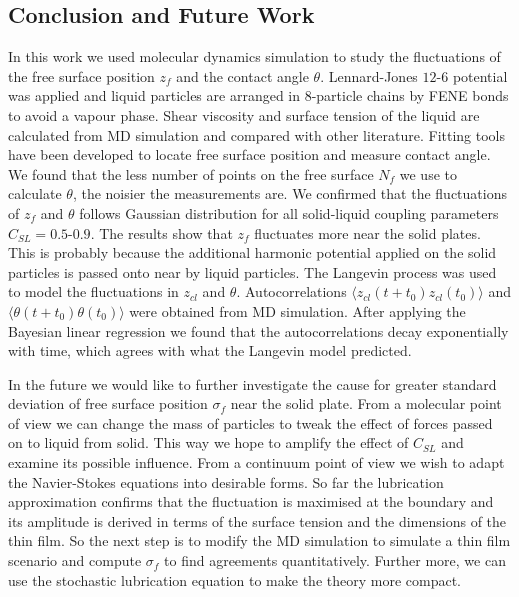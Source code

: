 \documentclass[
reprint,
 amsmath,amssymb,
 aps,
url
]{revtex4-1}
\begin{document}
\subsection{Conclusion and Future Work}

In this work we used molecular dynamics simulation to study the fluctuations of the free surface position $z_f$ and the contact angle $\theta$. Lennard-Jones $12$-$6$ potential was applied and liquid particles are arranged in 8-particle chains by FENE bonds to avoid a vapour phase. Shear viscosity and surface tension of the liquid are calculated from MD simulation and compared with other literature. Fitting tools have been developed to locate free surface position and measure contact angle. We found that the less number of points on the free surface $N_f$ we use to calculate $\theta$, the noisier the measurements are. We confirmed that the fluctuations of $z_f$ and $\theta$ follows Gaussian distribution for all solid-liquid coupling parameters $C_{SL}=0.5$-$0.9$. The results show that $z_f$ fluctuates more near the solid plates. This is probably because the additional harmonic potential applied on the solid particles is passed onto near by liquid particles. The Langevin process was used to model the fluctuations in $z_{cl}$ and $\theta$. Autocorrelations $\langle z_{cl}(t+t_0)z_{cl}(t_0)\rangle$ and $\langle \theta(t+t_0)\theta(t_0)\rangle$ were obtained from MD simulation. After applying the Bayesian linear regression we found that the autocorrelations decay exponentially with time, which agrees with what the Langevin model predicted. 

In the future we would like to further investigate the cause for greater standard deviation of free surface position $\sigma_f$ near the solid plate. From a molecular point of view we can change the mass of particles to tweak the effect of forces passed on to liquid from solid. This way we hope to amplify the effect of $C_{SL}$ and examine its possible influence. From a continuum point of view we wish to adapt the Navier-Stokes equations into desirable forms. So far the lubrication approximation confirms that the fluctuation is maximised at the boundary and its amplitude is derived in terms of the surface tension and the dimensions of the thin film. So the next step is to modify the MD simulation to simulate a thin film scenario and compute $\sigma_f$ to find agreements quantitatively. Further more, we can use the stochastic lubrication equation \cite{landau_fluid_1995} to make the theory more compact. 
\end{document}
